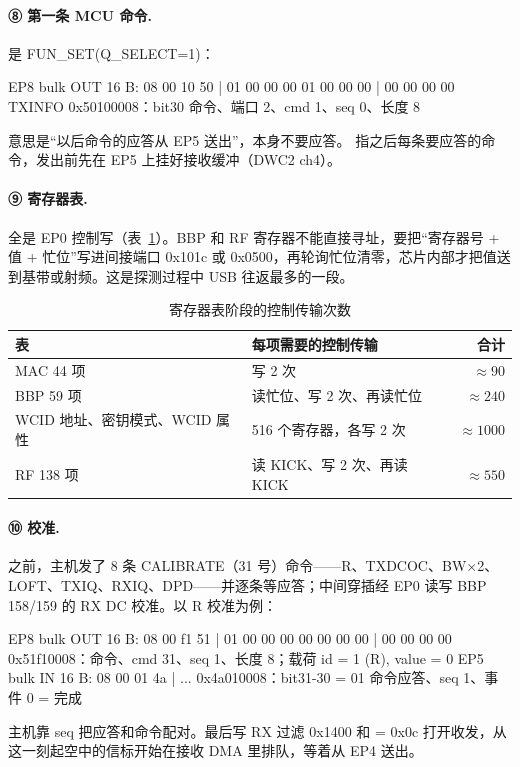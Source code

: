 \paragraph{⑧ 第一条 MCU 命令.}  是 FUN\_SET(Q\_SELECT=1)：
\begin{txtcode}
EP8  bulk OUT 16 B:  08 00 10 50 | 01 00 00 00 01 00 00 00 | 00 00 00 00
                     TXINFO 0x50100008：bit30 命令、端口 2、cmd 1、seq 0、长度 8
\end{txtcode}
意思是“以后命令的应答从 EP5 送出”，本身不要应答。 指之后每条要应答的命令，发出前先在 EP5 上挂好接收缓冲（DWC2 ch4）。

\paragraph{⑨ 寄存器表.}  全是 EP0 控制写（表~\ref{tab:mt7601u-ctrlcount}）。BBP 和 RF 寄存器不能直接寻址，要把“寄存器号 + 值 + 忙位”写进间接端口 0x101c 或 0x0500，再轮询忙位清零，芯片内部才把值送到基带或射频。这是探测过程中 USB 往返最多的一段。

\begin{table}[htbp]
  \centering
  \caption{寄存器表阶段的控制传输次数}
  \label{tab:mt7601u-ctrlcount}
  \small
  \begin{tabularx}{\linewidth}{@{}lXr@{}}
    \toprule
    表 & 每项需要的控制传输 & 合计 \\
    \midrule
    MAC 44 项 & 写 2 次 & $\approx 90$ \\
    BBP 59 项 & 读忙位、写 2 次、再读忙位 & $\approx 240$ \\
    WCID 地址、密钥模式、WCID 属性 & 516 个寄存器，各写 2 次 & $\approx 1000$ \\
    RF 138 项 & 读 KICK、写 2 次、再读 KICK & $\approx 550$ \\
    \bottomrule
  \end{tabularx}
\end{table}

\paragraph{⑩ 校准.}  之前，主机发了 8 条 CALIBRATE（31 号）命令——R、TXDCOC、BW$\times$2、LOFT、TXIQ、RXIQ、DPD——并逐条等应答；中间穿插经 EP0 读写 BBP 158/159 的 RX DC 校准。以 R 校准为例：
\begin{txtcode}
EP8  bulk OUT 16 B:  08 00 f1 51 | 01 00 00 00 00 00 00 00 | 00 00 00 00
                     0x51f10008：命令、cmd 31、seq 1、长度 8；载荷 {id = 1 (R), value = 0}
EP5  bulk IN  16 B:  08 00 01 4a | ...
                     0x4a010008：bit31-30 = 01 命令应答、seq 1、事件 0 = 完成
\end{txtcode}
主机靠 seq 把应答和命令配对。最后写 RX 过滤 0x1400 和  = 0x0c 打开收发，从这一刻起空中的信标开始在接收 DMA 里排队，等着从 EP4 送出。

